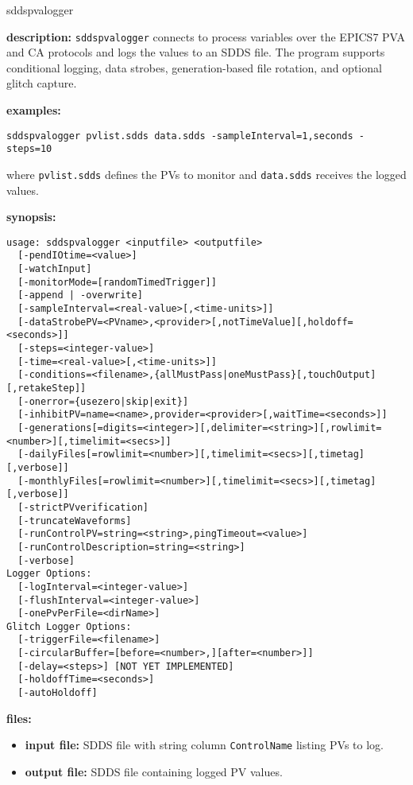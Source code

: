 \begin{sddsprog}{sddspvalogger}
\item \textbf{description:}
\verb+sddspvalogger+ connects to process variables over the EPICS7 PVA and CA protocols and logs the values to an SDDS file. The program supports conditional logging, data strobes, generation-based file rotation, and optional glitch capture.
\item \textbf{examples:}
\begin{verbatim}
sddspvalogger pvlist.sdds data.sdds -sampleInterval=1,seconds -steps=10
\end{verbatim}
where {\tt pvlist.sdds} defines the PVs to monitor and {\tt data.sdds} receives the logged values.
\item \textbf{synopsis:}
\begin{verbatim}
usage: sddspvalogger <inputfile> <outputfile>
  [-pendIOtime=<value>]
  [-watchInput]
  [-monitorMode=[randomTimedTrigger]]
  [-append | -overwrite]
  [-sampleInterval=<real-value>[,<time-units>]]
  [-dataStrobePV=<PVname>,<provider>[,notTimeValue][,holdoff=<seconds>]]
  [-steps=<integer-value>]
  [-time=<real-value>[,<time-units>]]
  [-conditions=<filename>,{allMustPass|oneMustPass}[,touchOutput][,retakeStep]]
  [-onerror={usezero|skip|exit}]
  [-inhibitPV=name=<name>,provider=<provider>[,waitTime=<seconds>]]
  [-generations[=digits=<integer>][,delimiter=<string>][,rowlimit=<number>][,timelimit=<secs>]]
  [-dailyFiles[=rowlimit=<number>][,timelimit=<secs>][,timetag][,verbose]]
  [-monthlyFiles[=rowlimit=<number>][,timelimit=<secs>][,timetag][,verbose]]
  [-strictPVverification]
  [-truncateWaveforms]
  [-runControlPV=string=<string>,pingTimeout=<value>]
  [-runControlDescription=string=<string>]
  [-verbose]
Logger Options:
  [-logInterval=<integer-value>]
  [-flushInterval=<integer-value>]
  [-onePvPerFile=<dirName>]
Glitch Logger Options:
  [-triggerFile=<filename>]
  [-circularBuffer=[before=<number>,][after=<number>]]
  [-delay=<steps>] [NOT YET IMPLEMENTED]
  [-holdoffTime=<seconds>]
  [-autoHoldoff]
\end{verbatim}
\item \textbf{files:}
\begin{itemize}
  \item \textbf{input file:} SDDS file with string column \verb|ControlName| listing PVs to log.
  \item \textbf{output file:} SDDS file containing logged PV values.
\end{itemize}


\end{sddsprog}
